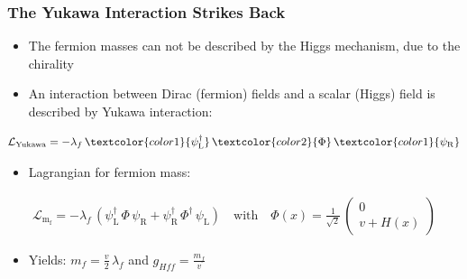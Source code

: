 \documentclass[xcolor={usenames,dvipsnames,svgnames,table}]{beamer}
\begin{document}
\begin{frame}
    \frametitle{The Yukawa Interaction Strikes Back}
    \begin{itemize}
        \item The fermion masses can not be described by the Higgs mechanism, due to the chirality
        \item An interaction between \textcolor{color1}{Dirac (fermion) fields} and a \textcolor{color2}{scalar (Higgs) field} is described by Yukawa interaction:
    \end{itemize}
    \begin{gather*}
        \label{eq_lagrangian_yukawa}
        \mathcal{L}_\mathrm{Yukawa} = - \lambda_f \, \textcolor{color1}{\ensuremath{\psi}\xspace_\mathrm{L}^\dagger} \, \textcolor{color2}{\Phi} \, \textcolor{color1}{\ensuremath{\psi}\xspace_\mathrm{R}}
    \end{gather*}
    \begin{itemize}
        \item Lagrangian for fermion mass:
    \end{itemize}
    \begin{gather*}
        \label{eq_lagrandian_mf}
        \mathcal{L}_\mathrm{m_f}= - \lambda_f \, (\ensuremath{\psi}\xspace_\mathrm{L}^\dagger \, \Phi \, \ensuremath{\psi}\xspace_\mathrm{R}+ \ensuremath{\psi}\xspace_\mathrm{R}^\dagger \, \Phi^\dagger \, \ensuremath{\psi}\xspace_\mathrm{L}) \quad \text{with} \quad \Phi(x) = \frac{1}{\sqrt 2} \, \begin{pmatrix} 0 \\ v + H(x) \end{pmatrix}
    \end{gather*}
    \begin{itemize}
        \item Yields: $m_f = \frac{v}{2} \, \lambda_f$ and $g_{Hff} = \frac{m_f}{v}$
    \end{itemize}
\end{frame}
\end{document}
